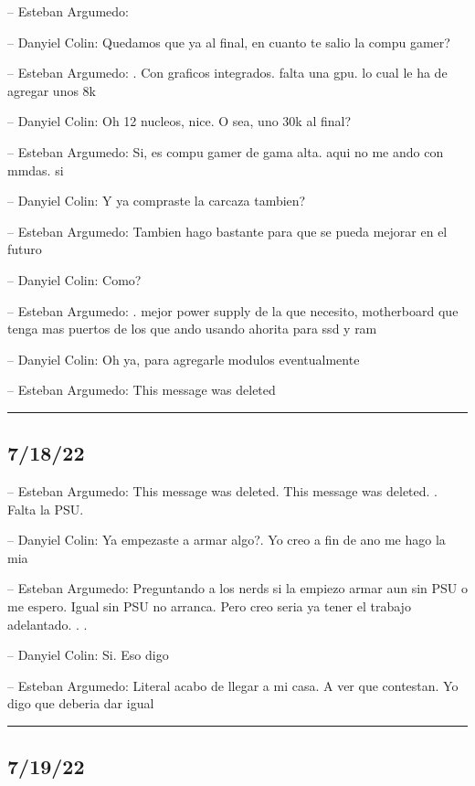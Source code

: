 -- Esteban Argumedo:

-- Danyiel Colin: Quedamos que ya al final, en cuanto te salio la compu
gamer?

-- Esteban Argumedo: . Con graficos integrados. falta una gpu. lo cual
le ha de agregar unos 8k

-- Danyiel Colin: Oh 12 nucleos, nice. O sea, uno 30k al final?

-- Esteban Argumedo: Si, es compu gamer de gama alta. aqui no me ando
con mmdas. si

-- Danyiel Colin: Y ya compraste la carcaza tambien?

-- Esteban Argumedo: Tambien hago bastante para que se pueda mejorar en
el futuro

-- Danyiel Colin: Como?

-- Esteban Argumedo: . mejor power supply de la que necesito,
motherboard que tenga mas puertos de los que ando usando ahorita para
ssd y ram

-- Danyiel Colin: Oh ya, para agregarle modulos eventualmente

-- Esteban Argumedo: This message was deleted

\begin{center}\rule{0.5\linewidth}{0.5pt}\end{center}

\hypertarget{section-126}{%
\subsection{7/18/22}\label{section-126}}

-- Esteban Argumedo: This message was deleted. This message was deleted.
. Falta la PSU.

-- Danyiel Colin: Ya empezaste a armar algo?. Yo creo a fin de ano me
hago la mia

-- Esteban Argumedo: Preguntando a los nerds si la empiezo armar aun sin
PSU o me espero. Igual sin PSU no arranca. Pero creo seria ya tener el
trabajo adelantado. . .

-- Danyiel Colin: Si. Eso digo

-- Esteban Argumedo: Literal acabo de llegar a mi casa. A ver que
contestan. Yo digo que deberia dar igual

\begin{center}\rule{0.5\linewidth}{0.5pt}\end{center}

\hypertarget{section-127}{%
\subsection{7/19/22}\label{section-127}}

